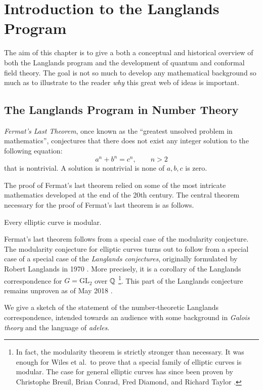 \chapter{Introduction to the Langlands Program\label{ch:intro}}

The aim of this chapter is to give a both a conceptual and historical overview of both the Langlands program and the development of quantum and conformal field theory. The goal is not so much to develop any mathematical background so much as to illustrate to the reader \emph{why} this great web of ideas is important.

\section{The Langlands Program in Number Theory} %
\label{sec:the_langlands_program_in_number_theory}

\emph{Fermat's Last Theorem}, once known as the ``greatest unsolved problem in mathematics'', conjectures that there does not exist any integer solution to the following equation:
$$a^n + b^n = c^n, \qquad n > 2$$
that is nontrivial. A solution is nontrivial is none of $a, b, c$ is zero.

The proof of Fermat's last theorem relied on some of the most intricate mathematics developed at the end of the 20th century. The central theorem necessary for the proof of Fermat's last theorem is as follows.
\begin{theorem}
	Every elliptic curve is modular.
\end{theorem}

Fermat's last theorem follows from a special case of the modularity conjecture. The modularity conjecture for elliptic curves turns out to follow from a special case of a special case of the \emph{Langlands conjectures}, originally formulated by Robert Langlands in 1970 \cite{Langlands1970}.
More precisely, it is a corollary of the Langlands correspondence for $G = \mathrm{GL}_2$ over $\mathbb{Q}$ \footnote{In fact, the modularity theorem is strictly stronger than necessary. It was enough for Wiles et al.\ to prove that a special family of elliptic curves is modular. The case for general elliptic curves has since been proven by Christophe Breuil, Brian Conrad, Fred Diamond, and Richard
Taylor \cite{breuil2001}.}. This part of the Langlands conjecture remains unproven as of May 2018 \cite{Yoo18}. 

We give a sketch of the statement of the number-theoretic Langlands correspondence, intended towards an audience with some background in \emph{Galois theory} and the language of \emph{adeles}. 

